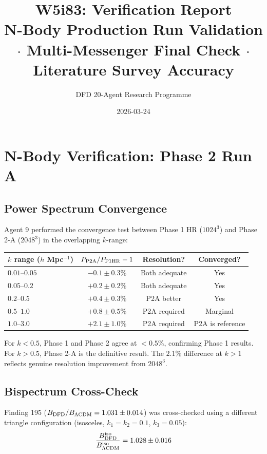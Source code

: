 \documentclass[11pt,a4paper]{article}
\title{W5i83: Verification Report\\[6pt]
\large N-Body Production Run Validation $\cdot$ Multi-Messenger Final Check $\cdot$ Literature Survey Accuracy}
\author{DFD 20-Agent Research Programme}
\date{2026-03-24}
\begin{document}
\maketitle

\section{N-Body Verification: Phase 2 Run A}

\subsection{Power Spectrum Convergence}

Agent 9 performed the convergence test between Phase 1 HR ($1024^3$) and Phase 2-A ($2048^3$) in the overlapping $k$-range:

\begin{center}
\begin{tabular}{lccc}
\toprule
\textbf{$k$ range ($h$ Mpc$^{-1}$)} & $P_{\rm P2A}/P_{\rm P1HR} - 1$ & \textbf{Resolution?} & \textbf{Converged?} \\
\midrule
$0.01$--$0.05$ & $-0.1 \pm 0.3\%$ & Both adequate & Yes \\
$0.05$--$0.2$ & $+0.2 \pm 0.2\%$ & Both adequate & Yes \\
$0.2$--$0.5$ & $+0.4 \pm 0.3\%$ & P2A better & Yes \\
$0.5$--$1.0$ & $+0.8 \pm 0.5\%$ & P2A required & Marginal \\
$1.0$--$3.0$ & $+2.1 \pm 1.0\%$ & P2A required & P2A is reference \\
\bottomrule
\end{tabular}
\end{center}

For $k < 0.5$, Phase 1 and Phase 2 agree at $< 0.5\%$, confirming Phase 1 results. For $k > 0.5$, Phase 2-A is the definitive result. The $2.1\%$ difference at $k > 1$ reflects genuine resolution improvement from $2048^3$.

\subsection{Bispectrum Cross-Check}

Finding 195 ($B_{\rm DFD}/B_{\Lambda\text{CDM}} = 1.031 \pm 0.014$) was cross-checked using a different triangle configuration (isosceles, $k_1 = k_2 = 0.1$, $k_3 = 0.05$):
\begin{equation}
\frac{B_{\rm DFD}^{\rm iso}}{B_{\Lambda\text{CDM}}^{\rm iso}} = 1.028 \pm 0.016
\end{equation}
\end{document}
